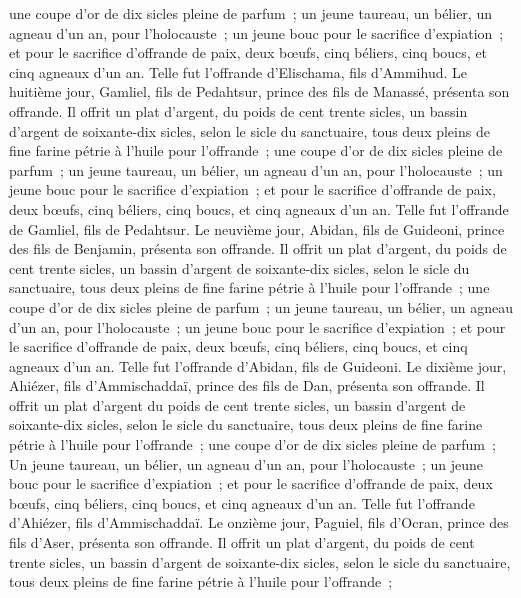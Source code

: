 \begin{multicols}{2}
une coupe d'or de dix sicles pleine de parfum~;
un jeune taureau, un bélier, un agneau d'un an, pour l'holocauste~;
un jeune bouc pour le sacrifice d'expiation~;
et pour le sacrifice d'offrande de paix, deux bœufs, cinq béliers, cinq boucs, et cinq agneaux d'un an. Telle fut l'offrande d'Elischama, fils d'Ammihud.
Le huitième jour, Gamliel, fils de Pedahtsur, prince des fils de Manassé, présenta son offrande.
Il offrit un plat d'argent, du poids de cent trente sicles, un bassin d'argent de soixante-dix sicles, selon le sicle du sanctuaire, tous deux pleins de fine farine pétrie à l'huile pour l'offrande~;
une coupe d'or de dix sicles pleine de parfum~;
un jeune taureau, un bélier, un agneau d'un an, pour l'holocauste~;
un jeune bouc pour le sacrifice d'expiation~;
et pour le sacrifice d'offrande de paix, deux bœufs, cinq béliers, cinq boucs, et cinq agneaux d'un an. Telle fut l'offrande de Gamliel, fils de Pedahtsur.
Le neuvième jour, Abidan, fils de Guideoni, prince des fils de Benjamin, présenta son offrande.
Il offrit un plat d'argent, du poids de cent trente sicles, un bassin d'argent de soixante-dix sicles, selon le sicle du sanctuaire, tous deux pleins de fine farine pétrie à l'huile pour l'offrande~;
une coupe d'or de dix sicles pleine de parfum~;
un jeune taureau, un bélier, un agneau d'un an, pour l'holocauste~;
un jeune bouc pour le sacrifice d'expiation~;
et pour le sacrifice d'offrande de paix, deux bœufs, cinq béliers, cinq boucs, et cinq agneaux d'un an. Telle fut l'offrande d'Abidan, fils de Guideoni.
Le dixième jour, Ahiézer, fils d'Ammischaddaï, prince des fils de Dan, présenta son offrande.
Il offrit un plat d'argent du poids de cent trente sicles, un bassin d'argent de soixante-dix sicles, selon le sicle du sanctuaire, tous deux pleins de fine farine pétrie à l'huile pour l'offrande~;
une coupe d'or de dix sicles pleine de parfum~;
Un jeune taureau, un bélier, un agneau d'un an, pour l'holocauste~;
un jeune bouc pour le sacrifice d'expiation~;
et pour le sacrifice d'offrande de paix, deux bœufs, cinq béliers, cinq boucs, et cinq agneaux d'un an. Telle fut l'offrande d'Ahiézer, fils d'Ammischaddaï.
Le onzième jour, Paguiel, fils d'Ocran, prince des fils d'Aser, présenta son offrande.
Il offrit un plat d'argent, du poids de cent trente sicles, un bassin d'argent de soixante-dix sicles, selon le sicle du sanctuaire, tous deux pleins de fine farine pétrie à l'huile pour l'offrande~;

\end{multicols}
